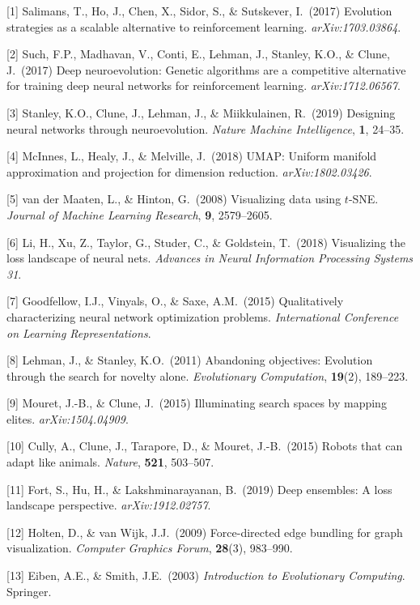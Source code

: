 \documentclass{article}
\begin{document}
\medskip
{
\small

[1] Salimans, T., Ho, J., Chen, X., Sidor, S., \& Sutskever, I.\ (2017)
Evolution strategies as a scalable alternative to reinforcement learning.
\textit{arXiv:1703.03864}.

[2] Such, F.P., Madhavan, V., Conti, E., Lehman, J., Stanley, K.O., \&
Clune, J.\ (2017) Deep neuroevolution: Genetic algorithms are a competitive
alternative for training deep neural networks for reinforcement learning.
\textit{arXiv:1712.06567}.

[3] Stanley, K.O., Clune, J., Lehman, J., \& Miikkulainen, R.\ (2019)
Designing neural networks through neuroevolution.
\textit{Nature Machine Intelligence}, \textbf{1}, 24--35.

[4] McInnes, L., Healy, J., \& Melville, J.\ (2018)
UMAP: Uniform manifold approximation and projection for dimension reduction.
\textit{arXiv:1802.03426}.

[5] van der Maaten, L., \& Hinton, G.\ (2008)
Visualizing data using $t$-SNE.
\textit{Journal of Machine Learning Research}, \textbf{9}, 2579--2605.

[6] Li, H., Xu, Z., Taylor, G., Studer, C., \& Goldstein, T.\ (2018)
Visualizing the loss landscape of neural nets.
\textit{Advances in Neural Information Processing Systems 31}.

[7] Goodfellow, I.J., Vinyals, O., \& Saxe, A.M.\ (2015)
Qualitatively characterizing neural network optimization problems.
\textit{International Conference on Learning Representations}.

[8] Lehman, J., \& Stanley, K.O.\ (2011)
Abandoning objectives: Evolution through the search for novelty alone.
\textit{Evolutionary Computation}, \textbf{19}(2), 189--223.

[9] Mouret, J.-B., \& Clune, J.\ (2015)
Illuminating search spaces by mapping elites.
\textit{arXiv:1504.04909}.

[10] Cully, A., Clune, J., Tarapore, D., \& Mouret, J.-B.\ (2015)
Robots that can adapt like animals.
\textit{Nature}, \textbf{521}, 503--507.

[11] Fort, S., Hu, H., \& Lakshminarayanan, B.\ (2019)
Deep ensembles: A loss landscape perspective.
\textit{arXiv:1912.02757}.

[12] Holten, D., \& van Wijk, J.J.\ (2009)
Force-directed edge bundling for graph visualization.
\textit{Computer Graphics Forum}, \textbf{28}(3), 983--990.

[13] Eiben, A.E., \& Smith, J.E.\ (2003)
\textit{Introduction to Evolutionary Computing}.
Springer.

}
\end{document}

